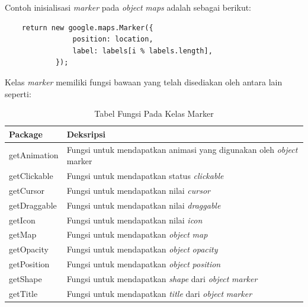 Contoh inisialisasi \textit{marker} pada  \textit{object} \textit{maps} adalah sebagai berikut:
\begin{lstlisting}
    return new google.maps.Marker({
                position: location,
                label: labels[i % labels.length],
            });
\end{lstlisting}
Kelas \textit{marker} memiliki fungsi bawaan yang telah disediakan oleh antara lain seperti:
\begin{table}[H] 
	\centering 
	\caption{Tabel Fungsi Pada Kelas Marker}
	\label{tab:radioPackages}
	\begin{tabular}{|p{8cm}|p{8cm}|}
	\hline
		Package & Deksripsi \\
    \hline
		getAnimation & Fungsi untuk mendapatkan animasi yang digunakan oleh \textit{object} marker \\
		getClickable  & Fungsi untuk mendapatkan status \textit{clickable} \\
		getCursor  & Fungsi untuk mendapatkan nilai \textit{cursor} \\
		getDraggable  & Fungsi untuk mendapatkan nilai \textit{draggable} \\
		getIcon  & Fungsi untuk mendapatkan nilai \textit{icon} \\
		getMap  & Fungsi untuk mendapatkan \textit{object} \textit{map} \\
		getOpacity  & Fungsi untuk mendapatkan \textit{object} \textit{opacity} \\
		getPosition  & Fungsi untuk mendapatkan \textit{object} \textit{position} \\
		getShape  & Fungsi untuk mendapatkan \textit{shape} dari \textit{object} \textit{marker} \\
		getTitle  & Fungsi untuk mendapatkan \textit{title} dari \textit{object} \textit{marker} \\
		\hline
	\end{tabular} 
\end{table}



